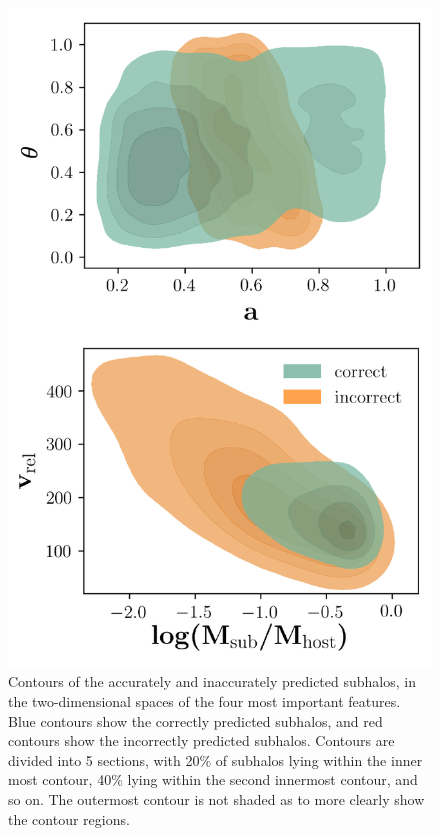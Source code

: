 \documentclass[fleqn,usenatbib]{mnras}
\begin{document}
\begin{figure}
	\includegraphics[width=\textwidth]{Figures/survival_contours}
    \caption{Contours of the accurately and inaccurately predicted subhalos, in the two-dimensional spaces of the four most important features. Blue contours show the correctly predicted subhalos, and red contours show the incorrectly predicted subhalos. Contours are divided into 5 sections, with 20\% of subhalos lying within the inner most contour, 40\% lying within the second innermost contour, and so on. The outermost contour is not shaded as to more clearly show the contour regions.}
    \label{fig:survival_contours}
\end{figure}
\end{document}
